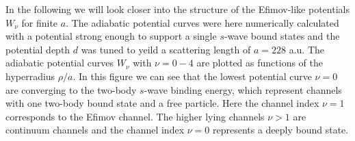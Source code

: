 
In the following we will look closer into the structure of the Efimov-like potentials $W_{\nu}$ for finite $a$. The adiabatic potential curves were here numerically calculated with a potential strong enough to support a single $s$-wave bound states and the potential depth $d$ was tuned to yeild a scattering length of $a=228$ a.u. The adiabatic potential curves $W_{\nu}$ with $\nu = 0-4$ are plotted as functions of the hyperradius $\rho/a$. In this figure we can see that the lowest potential curve $\nu = 0$ are converging to the two-body $s$-wave binding energy, which represent channels with one two-body bound state and a free particle. Here the channel index $\nu=1$ corresponds to the Efimov channel. The higher lying channels $\nu>1$ are continuum channels and the channel index $\nu=0$ represents a deeply bound state.

